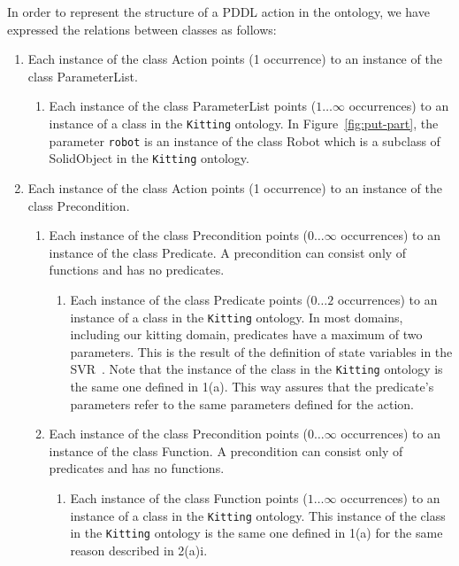 In order to represent the structure of a PDDL action in the ontology, we have expressed the relations between classes as follows:
\begin{enumerate}
  \item Each instance of the class \textsf{Action} points (1 occurrence) to an instance of the class \textsf{ParameterList}.
  \begin{enumerate}
  \item Each instance of the class \textsf{ParameterList} points ($1\ldots\infty$ occurrences) to an instance of a class in the \texttt{Kitting} ontology. In Figure~\ref{fig:put-part}, the parameter \texttt{robot} is an instance of the class \textsf{Robot} which is a subclass of \textsf{SolidObject} in the \texttt{Kitting} ontology.
\end{enumerate}
  \item Each instance of the class \textsf{Action} points (1 occurrence) to an instance of the class \textsf{Precondition}.
  \begin{enumerate}
  \item Each instance of the class \textsf{Precondition} points ($0\ldots\infty$ occurrences) to an instance of the class \textsf{Predicate}. A precondition can consist only of functions and has no predicates.
  \begin{enumerate}
  \item Each instance of the class \textsf{Predicate} points ($0\ldots2$ occurrences) to an instance of  a class in the \texttt{Kitting} ontology. In most domains, including our kitting domain, predicates have a maximum of two parameters. This is the result of the definition of state variables in the SVR~\cite{BALAKIRSKY.IROS.2012}. Note that the instance of the class in the \texttt{Kitting} ontology is the same one defined in 1(a). This way assures that the predicate's parameters refer to the same parameters defined for the action.
  \end{enumerate}
    \item Each instance of the class \textsf{Precondition} points ($0\ldots\infty$ occurrences) to an instance of the class \textsf{Function}. A precondition can consist only of predicates and has no functions.
    \begin{enumerate}
    \item Each instance of the class \textsf{Function} points ($1\ldots\infty$ occurrences) to an instance of a class in the \texttt{Kitting} ontology. This instance of the class in the \texttt{Kitting} ontology is the same one defined in 1(a) for the same reason described in 2(a)i.

\end{enumerate}
\end{enumerate}
\end{enumerate}
